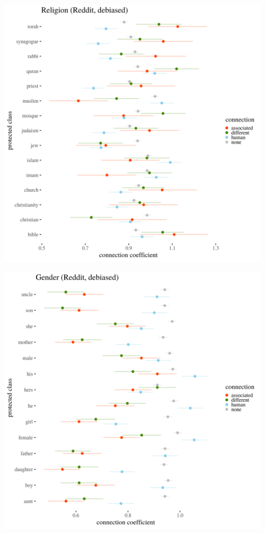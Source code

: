 \documentclass[
  12pt,
]{book}
\begin{document}
\includegraphics[width=14cm]{../images/visDebReligionReddit.png}

\includegraphics[width=14cm]{../images/visDebGenderReddit.png}
\end{document}
